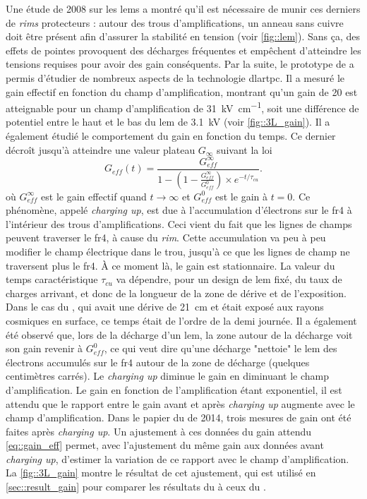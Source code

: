       Une étude de 2008 sur les \glspl{lem}\cite{Breskin2008} a montré qu'il est nécessaire de munir ces derniers de \textit{rims} protecteurs : autour des trous d'amplifications, un anneau sans cuivre doit être présent afin d'assurer la stabilité en tension (voir \autoref{fig::lem}). Sans ça, des effets de pointes provoquent des décharges fréquentes et empêchent d'atteindre les tensions requises pour avoir des gain conséquents. Par la suite, le prototype de \threeL{}\cite{Cantini2013,Cantini2014} a permis d'étudier de nombreux aspects de la technologie \gls{dlartpc}. Il a mesuré le gain effectif en fonction du champ d'amplification, montrant qu'un gain de 20 est atteignable pour un champ d'amplification de \SI{31}{\kilo\volt\per\centi\meter}, soit une différence de potentiel entre le haut et le bas du \gls{lem} de \SI{3.1}{\kilo\volt} (voir \autoref{fig::3L_gain}). Il a également étudié le comportement du gain en fonction du temps. Ce dernier décroît jusqu'à atteindre une valeur plateau $G_{\infty}$ suivant la loi
      \begin{equation}
        G_{eff}(t) = \frac{G_{eff}^{\infty}}{1-\left(1-\frac{G_{eff}^{\infty}}{G_{eff}^0}\right)\times e^{-t/\tau_{cu}}}.
      \end{equation}
      où $G_{eff}^{\infty}$ est le gain effectif quand $t\to\infty$ et $G_{eff}^0$ est le gain à $t=0$. Ce phénomène, appelé \textit{charging up}, est due à l'accumulation d'électrons sur le \gls{fr4} à l'intérieur des trous d'amplifications. Ceci vient du fait que les lignes de champs peuvent traverser le \gls{fr4}, à cause du \textit{rim}. Cette accumulation va peu à peu modifier le champ électrique dans le trou, jusqu'à ce que les lignes de champ ne traversent plus le \gls{fr4}. À ce moment là, le gain est stationnaire. La valeur du temps caractéristique $\tau_{cu}$ va dépendre, pour un design de \gls{lem} fixé, du taux de charges arrivant, et donc de la longueur de la zone de dérive et de l'exposition. Dans le cas du \threeL{}, qui avait une dérive de \SI{21}{\centi\meter} et était exposé aux rayons cosmiques en surface, ce temps était de l'ordre de la demi journée. Il a également été observé que, lors de la décharge d'un \gls{lem}, la zone autour de la décharge voit son gain revenir à $G_{eff}^0$, ce qui veut dire qu'une décharge "nettoie" le \gls{lem} des électrons accumulés sur le \gls{fr4} autour de la zone de décharge (quelques centimètres carrés).  Le \textit{charging up} diminue le gain en diminuant le champ d'amplification. Le gain en fonction de l'amplification étant exponentiel, il est attendu que le rapport entre le gain avant et après \textit{charging up} augmente avec le champ d'amplification. Dans le papier du \threeL{} de 2014, trois mesures de gain ont été faites après \textit{charging up}. Un ajustement à ces données du gain attendu \eqref{eq::gain_eff} permet, avec l'ajustement du même gain aux données avant \textit{charging up}, d'estimer la variation de ce rapport avec le champ d'amplification. La \autoref{fig::3L_gain} montre le résultat de cet ajustement, qui est utilisé en \autoref{sec::result_gain} pour comparer les résultats du \TOO{} à ceux du \threeL{}.

